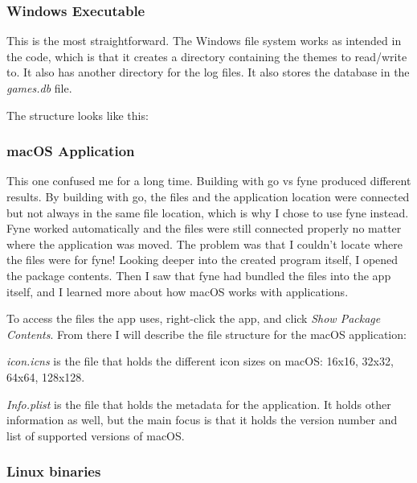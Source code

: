 \subsubsection{Windows Executable}
\label{subsubsec:WinExec}

This is the most straightforward. The Windows file system works as
intended in the code, which is that it creates a directory containing
the themes to read/write to. It also has another directory for the
log files. It also stores the database in the \textit{games.db} file.

The structure looks like this:


\subsubsection{macOS Application}

This one confused me for a long time.
Building with go vs fyne produced different results.
By building with go, the files and the application location were
connected but not always in the same file location, which is why I
chose to use fyne instead.
Fyne worked automatically and the files were still connected properly
no matter where the application was moved.
The problem was that I couldn't locate where the files were for fyne!
Looking deeper into the created program itself, I opened the package contents.
Then I saw that fyne had bundled the files into the app itself, and I
learned more about how macOS works with applications.

To access the files the app uses, right-click the app, and click
\textit{Show Package Contents}.
From there I will describe the file structure for the macOS application:


\textit{icon.icns} is the file that holds the different icon sizes on
macOS: 16x16, 32x32, 64x64, 128x128.

\textit{Info.plist} is the file that holds the metadata for the
application. It holds other information as well, but the main focus
is that it holds the version number and list of supported versions of macOS.

\subsubsection{Linux binaries}


